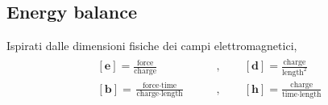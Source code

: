 \documentclass[letterpaper,10pt,english]{jupyterBook}
\begin{document}
\subsection{Energy balance}
\label{\detokenize{ch/forces-moments-on-charges:energy-balance}}
\sphinxAtStartPar
{} 

\sphinxAtStartPar
Ispirati dalle dimensioni fisiche dei campi elettromagnetici,
\begin{equation*}
\begin{split}\begin{aligned}
\left[\mathbf{e}\right] = \frac{\text{force}}{\text{charge}} \qquad & , \qquad
[\mathbf{d}] = \frac{\text{charge}}{\text{length}^2} \\
[\mathbf{b}] = \frac{\text{force}\cdot\text{time}}{\text{charge}\cdot\text{length}} \qquad & , \qquad
[\mathbf{h}] = \frac{\text{charge}}{\text{time} \cdot \text{length}}
\end{aligned}\end{split}
\end{equation*}
\end{document}
